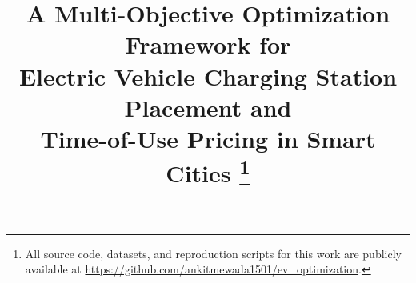 \documentclass[conference]{IEEEtran}
\begin{document}
\title{A Multi-Objective Optimization Framework for\\
       Electric Vehicle Charging Station Placement and\\
       Time-of-Use Pricing in Smart Cities%
       \thanks{All source code, datasets, and reproduction
       scripts for this work are publicly available at
       \url{https://github.com/ankitmewada1501/ev_optimization}.}}

\author{
\and
{}
\and
{}
}

\maketitle
\end{document}
